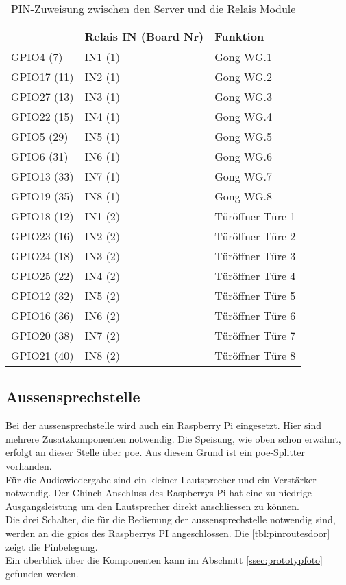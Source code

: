 \begin{table}[]
	\centering
	\label{my-label}
	\begin{tabular}{l|ll}
		\multicolumn{1}{r|}{} \textbf{Pi GPIO (PIN)} & \textbf{Relais IN (Board Nr)} & \textbf{Funktion}  \hspace{60pt}	\\ \hline
		GPIO4 (7)	&	IN1 (1)			& Gong WG.1			\\ \hline
		GPIO17 (11)	&	IN2 (1)			& Gong WG.2			\\ \hline
		GPIO27 (13)	&	IN3 (1)			& Gong WG.3			\\ \hline
		GPIO22 (15)	&	IN4 (1)			& Gong WG.4			\\ \hline
		GPIO5 (29)	&	IN5 (1)			& Gong WG.5			\\ \hline
		GPIO6 (31)	&	IN6 (1)			& Gong WG.6			\\ \hline
		GPIO13 (33)	&	IN7 (1)			& Gong WG.7			\\ \hline
		GPIO19 (35)	&	IN8 (1)			& Gong WG.8			\\ \hline
		GPIO18 (12)	&	IN1 (2)			& Türöffner Türe 1			\\ \hline
		GPIO23 (16)	&	IN2 (2)			& Türöffner Türe 2			\\ \hline
		GPIO24 (18)	&	IN3 (2)			& Türöffner Türe 3			\\ \hline
		GPIO25 (22)	&	IN4 (2)			& Türöffner Türe 4			\\ \hline
		GPIO12 (32)	&	IN5 (2)			& Türöffner Türe 5			\\ \hline
		GPIO16 (36)	&	IN6 (2)			& Türöffner Türe 6			\\ \hline
		GPIO20 (38)	&	IN7 (2)			& Türöffner Türe 7			\\ \hline
		GPIO21 (40)	&	IN8 (2)			& Türöffner Türe 8			\\ \hline
	\end{tabular}
	\caption{PIN-Zuweisung zwischen den Server und die Relais Module}
	\label{tbl:pinroutes}
\end{table}


\subsection{Aussensprechstelle}
\label{sec:chapterexample}
Bei der \gls{aussensprechstelle} wird auch ein Raspberry Pi eingesetzt. Hier sind mehrere Zusatzkomponenten notwendig. Die Speisung, wie oben schon erwähnt, erfolgt an dieser Stelle über \gls{poe}. Aus diesem Grund ist ein \gls{poe}-Splitter vorhanden.
\\
Für die Audiowiedergabe sind ein kleiner Lautsprecher und ein Verstärker notwendig. Der Chinch Anschluss des Raspberrys Pi hat eine zu niedrige Ausgangsleistung um den Lautsprecher direkt anschliessen zu können.
\\
Die drei Schalter, die für die Bedienung der \gls{aussensprechstelle} notwendig sind, werden an die \gls{gpio}s des Raspberrys PI angeschlossen. Die \cref{tbl:pinroutesdoor} zeigt die Pinbelegung.
\\
Ein überblick über die Komponenten kann im Abschnitt \ref{ssec:prototypfoto} gefunden werden.

